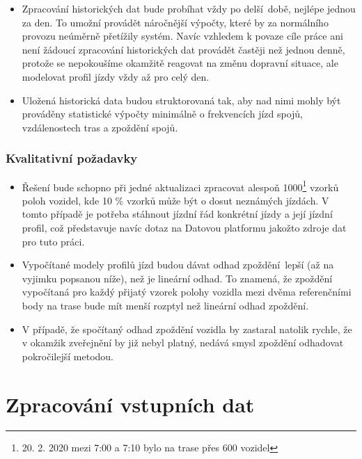 \begin{itemize}
\item

Zpracování historických dat bude probíhat vždy po delší době, nejlépe jednou za den. To umožní provádět náročnější výpočty, které by za normálního provozu neúměrně přetížily systém. Navíc vzhledem k povaze cíle práce ani není žádoucí zpracování historických dat provádět častěji než jednou denně, protože se nepokoušíme okamžitě reagovat na změnu dopravní situace, ale modelovat profil jízdy vždy až pro celý den.

\item

Uložená historická data budou struktorovaná tak, aby nad nimi mohly být prováděny statistické výpočty minimálně o frekvencích jízd spojů, vzdálenostech tras a zpoždění spojů.
\end{itemize}

\subsubsection{Kvalitativní požadavky} \label{subsubsection:kvalitativni_pozadavky}

\begin{itemize}

	\item
	Řešení bude schopno při jedné aktualizaci zpracovat alespoň 1000\footnote{20. 2. 2020 mezi 7:00 a 7:10 bylo na trase přes 600 vozidel} vzorků poloh vozidel, kde 10 \% vzorků může být o dosut neznámých jízdách. V tomto případě je potřeba stáhnout jízdní řád konkrétní jízdy a její jízdní profil, což představuje navíc dotaz na Datovou platformu jakožto zdroje dat pro tuto práci.

	\item
	Vypočítané modely profilů jízd budou dávat odhad zpoždění lepší (až na vyjimku popsanou níže), než je lineární odhad. To znamená, že zpoždění vypočítaná pro každý přijatý vzorek polohy vozidla mezi dvěma referenčními body na trase bude mít menší rozptyl než lineární odhad zpoždění.

	\item
	V případě, že spočítaný odhad zpoždění vozidla by zastaral natolik rychle, že v okamžik zveřejnění by již nebyl platný, nedává smysl zpoždění odhadovat pokročilejší metodou.

\end{itemize}


\section{Zpracování vstupních dat} \label{section:zpracovani_vstupnich_dat}

